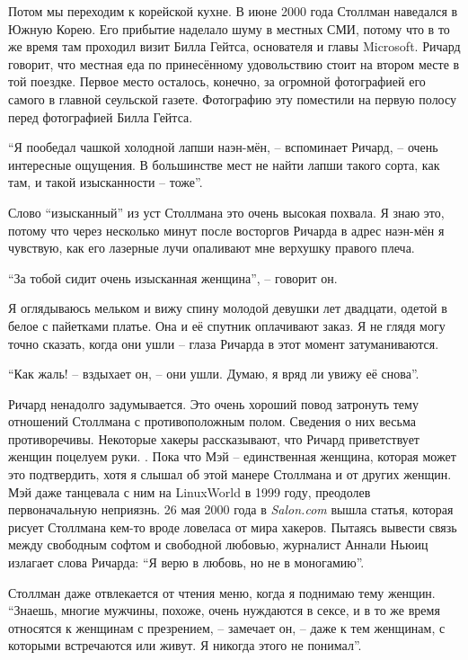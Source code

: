 Потом мы переходим к корейской кухне. В июне 2000 года Столлман наведался в Южную Корею. Его прибытие наделало шуму в местных СМИ, потому что в то же время там проходил визит Билла Гейтса, основателя и главы Microsoft. Ричард говорит, что местная еда по принесённому удовольствию стоит на втором месте в той поездке. Первое место осталось, конечно, за огромной фотографией его самого в главной сеульской газете. Фотографию эту поместили на первую полосу перед фотографией Билла Гейтса.

\enquote{Я пообедал чашкой холодной лапши наэн-мён, -- вспоминает Ричард, -- очень интересные ощущения. В большинстве мест не найти лапши такого сорта, как там, и такой изысканности -- тоже}.

Слово \enquote{изысканный} из уст Столлмана это очень высокая похвала. Я знаю это, потому что через несколько минут после восторгов Ричарда в адрес наэн-мён я чувствую, как его лазерные лучи опаливают мне верхушку правого плеча.

\enquote{За тобой сидит очень изысканная женщина}, -- говорит он.

Я оглядываюсь мельком и вижу спину молодой девушки лет двадцати, одетой в белое с пайетками платье. Она и её спутник оплачивают заказ. Я не глядя могу точно сказать, когда они ушли -- глаза Ричарда в этот момент затуманиваются.

\enquote{Как жаль! -- вздыхает он, -- они ушли. Думаю, я вряд ли увижу её снова}.

Ричард ненадолго задумывается. Это очень хороший повод затронуть тему отношений Столлмана с противоположным полом. Сведения о них весьма противоречивы. Некоторые хакеры рассказывают, что Ричард приветствует женщин поцелуем руки. . Пока что Мэй -- единственная женщина, которая может это подтвердить, хотя я слышал об этой манере Столлмана и от других женщин. Мэй даже танцевала с ним на LinuxWorld в 1999 году, преодолев первоначальную неприязнь. 26 мая 2000 года в \textit{Salon.com} вышла статья, которая рисует Столлмана кем-то вроде ловеласа от мира хакеров. Пытаясь вывести связь между свободным софтом и свободной любовью, журналист Аннали Ньюиц излагает слова Ричарда: \enquote{Я верю в любовь, но не в моногамию}.

Столлман даже отвлекается от чтения меню, когда я поднимаю тему женщин. \enquote{Знаешь, многие мужчины, похоже, очень нуждаются в сексе, и в то же время относятся к женщинам с презрением, -- замечает он, -- даже к тем женщинам, с которыми встречаются или живут. Я никогда этого не понимал}.

